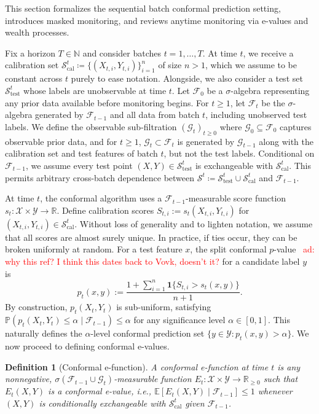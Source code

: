 \documentclass{uai2026} %
\newtheorem{definition}[theorem]{Definition}
\newcommand{\N}{\mathbb{N}}
\newcommand{\R}{\mathbb{R}}
\newcommand{\1}{\mathbf{1}}
\newcommand{\ind}[1]{\mathbf{1}\{#1\}}
\newcommand{\prob}{\mathbb{P}}
\newcommand{\expec}{\mathbb{E}}
\newcommand{\test}{\mathrm{test}}
\newcommand{\xcal}{\mathcal{X}}
\newcommand{\ycal}{\mathcal{Y}}
\newcommand{\scal}{\mathcal{S}}
\newcommand{\eqdef}{\coloneqq}
\newcommand{\F}{\mathcal{F}}
\newcommand{\G}{\mathcal{G}}
\newcommand{\fcal}{\F}
\newcommand{\cali}{\mathrm{cal}}
\newcommand{\scalcal}{\scal_{\cali}}
\newcommand{\scaltest}{\scal_{\test}}
\newcommand{\aymeric}[1]{\textcolor{red}{ad: #1}}
\begin{document}
This section formalizes the sequential batch conformal prediction setting, introduces masked monitoring, and reviews anytime monitoring via e-values and wealth processes.

Fix a horizon $T\in\N$ and consider batches $t=1,\dots,T$. At time $t$, we receive a calibration set $\scalcal^t \coloneqq \{(X_{t,i},Y_{t,i})\}_{i=1}^n$ of size $n>1$, which we assume to be constant across $t$ purely to ease notation. Alongside, we also consider a test set $\scaltest^t$ whose labels are unobservable at time $t$. Let $\F_0$ be a $\sigma$-algebra representing any prior data available before monitoring begins. For $t\ge 1$, let $\F_t$ be the $\sigma$-algebra generated by $\F_{t-1}$ and all data from batch $t$, including unobserved test labels. We define the observable sub-filtration $(\G_t)_{t\ge 0}$ where $\G_0 \subseteq \F_0$ captures observable prior data, and for $t \ge 1$, $\G_t \subset \F_t$ is generated by $\G_{t-1}$ along with the calibration set and test features of batch $t$, but not the test labels. Conditional on $\F_{t-1}$, we assume every test point $(X, Y) \in \scaltest^t$ is exchangeable with $\scalcal^t$. This permits arbitrary cross-batch dependence between $\scal^t \eqdef \scaltest^t \cup \scalcal^t$ and $\F_{t-1}$.

At time $t$, the conformal algorithm uses a $\fcal_{t-1}$-measurable score function $s_t:\xcal\times\ycal\to\R$. Define calibration scores $S_{t,i}:=s_t(X_{t,i},Y_{t,i})$ for $(X_{t,i},Y_{t,i})\in \scalcal^t$. Without loss of generality and to lighten notation, we assume that all scores are almost surely unique. In practice, if ties occur, they can be broken uniformly at random. For a test feature $x$, the split conformal $p$-value~\citep{papadopoulos2008inductive} \aymeric{why this ref? I think this dates back to Vovk, doesn't it?} for a candidate label $y$ is
\begin{equation} \label{eq:pt-def}
p_t(x,y):=\frac{1+\sum_{i=1}^{n}\ind{S_{t,i}>s_t(x,y)}}{n+1}.
\end{equation}
By construction, $p_t(X_t, Y_t)$ is sub-uniform, satisfying $\prob(p_t(X_t, Y_t) \le \alpha \mid \F_{t-1}) \le \alpha$ for any significance level $\alpha \in [0,1]$. This naturally defines the $\alpha$-level conformal prediction set $\{y \in \ycal : p_t(x,y) > \alpha\}$. We now proceed to defining conformal e-values.

\begin{definition}[Conformal e-function]
  A conformal e-function at time $t$ is any nonnegative, $\sigma(\F_{t-1} \cup \G_t)$-measurable function $E_t:\xcal\times\ycal\to\R_{\ge 0}$ such that $E_t(X,Y)$ is a conformal e-value, i.e.,  $\expec[E_t(X,Y) \mid \F_{t-1}] \le 1$ whenever $(X,Y)$ is conditionally exchangeable with $\scalcal^t$ given $\F_{t-1}$.
\end{definition}
\end{document}
